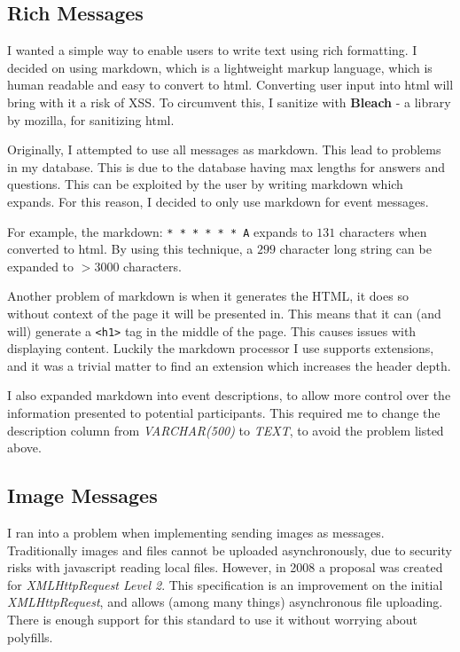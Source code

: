 \documentclass[a4paper,oneside,12pt,draft]{report}
\begin{document}
	\subsection{Rich Messages}
	I wanted a simple way to enable users to write text using rich formatting. I decided on using markdown, which is a lightweight markup language, which is human readable and easy to convert to html. Converting user input into html will bring with it a risk of XSS. To circumvent this, I sanitize with \textbf{Bleach} - a library by mozilla, for sanitizing html.


	Originally, I attempted to use all messages as markdown. This lead to problems in my database. This is due to the database having max lengths for answers and questions. This can be exploited by the user by writing markdown which expands. For this reason, I decided to only use markdown for event messages.

	\begin{framed}
		For example, the markdown: \verb+* * * * * * A+ expands to \(131\) characters when converted to html. By using this technique, a \(299\) character long string can be expanded to \(> 3000\) characters.
	\end{framed}

	\lstset{language=html}
	Another problem of markdown is when it generates the HTML, it does so without context of the page it will be presented in. This means that it can (and will) generate a \lstinline|<h1>| tag in the middle of the page. This causes issues with displaying content. Luckily the markdown processor I use supports extensions, and it was a trivial matter to find an extension which increases the header depth.

	I also expanded markdown into event descriptions, to allow more control over the information presented to potential participants. This required me to change the description column from  \textit{VARCHAR(500)} to \textit{TEXT}, to avoid the problem listed above.


	\subsection{Image Messages}
	I ran into a problem when implementing sending images as messages. Traditionally images and files cannot be uploaded asynchronously, due to security risks with javascript reading local files. However, in 2008 a proposal was created for \textit{XMLHttpRequest Level 2}. This specification is an improvement on the initial \textit{XMLHttpRequest}, and allows (among many things) asynchronous file uploading. There is enough support for this standard to use it without worrying about polyfills.
\end{document}
